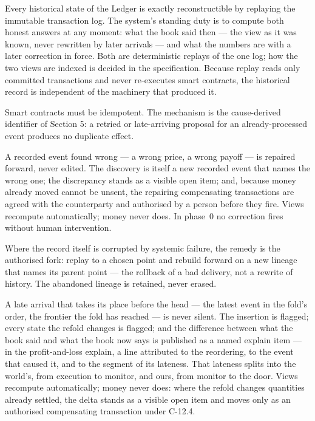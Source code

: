 \documentclass[11pt,a4paper]{article}
\newcommand{\clabel}[1]{\leavevmode\hypertarget{clause-#1}{}%
  \marginpar{\raggedright\scriptsize\ttfamily\textcolor{gray}{#1}}}
\begin{document}
\clabel{C-12.1}Every historical state of the Ledger is exactly
reconstructible by replaying the immutable transaction log. The
system's standing duty is to compute both honest answers at any moment:
what the book said then --- the view as it was known, never rewritten
by later arrivals --- and what the numbers are with a later correction
in force. Both are deterministic replays of the one log; how the two
views are indexed is decided in the specification.
\clabel{C-12.2}Because replay reads only committed transactions and
never re-executes smart contracts, the historical record is independent
of the machinery that produced it.

\clabel{C-12.3}Smart contracts must be idempotent. The mechanism is the
cause-derived identifier of Section 5: a retried or late-arriving
proposal for an already-processed event produces no duplicate effect.

\clabel{C-12.4}A recorded event found wrong --- a wrong price, a wrong
payoff --- is repaired forward, never edited. The discovery is itself a
new recorded event that names the wrong one; the discrepancy stands as
a visible open item; and, because money already moved cannot be unsent,
the repairing compensating transactions are agreed with the
counterparty and authorised by a person before they fire. Views
recompute automatically; money never does. In phase~0 no correction
fires without human intervention.

\clabel{C-12.5}Where the record itself is corrupted by systemic
failure, the remedy is the authorised fork: replay to a chosen point
and rebuild forward on a new lineage that names its parent point ---
the rollback of a bad delivery, not a rewrite of history. The abandoned
lineage is retained, never erased.

\clabel{C-12.6}A late arrival that takes its place before the head ---
the latest event in the fold's order, the frontier the fold has
reached --- is never silent. The insertion is flagged; every state the
refold changes is flagged; and the difference between what the book
said and what the book now says is published as a named explain item
--- in the profit-and-loss explain, a line attributed to the
reordering, to the event that caused it, and to the segment of its
lateness. That lateness splits into the world's, from execution to
monitor, and ours, from monitor to the door. Views recompute
automatically; money never does: where the refold changes quantities
already settled, the delta stands as a visible open item and moves only
as an authorised compensating transaction under C-12.4.
\end{document}
